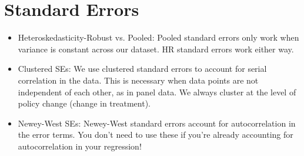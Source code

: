 \documentclass{article}
\begin{document}
\section{Standard Errors}

\begin{itemize}
    \item Heteroskedasticity-Robust vs. Pooled: Pooled standard errors only work when variance is constant across our dataset. HR standard errors work either way.
    \item Clustered SEs: We use clustered standard errors to account for serial correlation in the data. This is necessary when data points are not independent of each other, as in panel data. We always cluster at the level of policy change (change in treatment).
    \item Newey-West SEs: Newey-West standard errors account for autocorrelation in the error terms. You don't need to use these if you're already accounting for autocorrelation in your regression!
\end{itemize}
\end{document}
